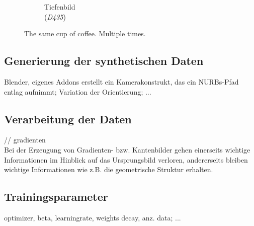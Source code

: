 \begin{figure}[h!]
\begin{subfigure}[b]{0.31\linewidth}
		\caption{Tiefenbild \\ (\textit{D435})}
	\end{subfigure}
	\caption{The same cup of coffee. Multiple times.}
	\label{fig:coffee3}
\end{figure}


\subsection{Generierung der synthetischen Daten}
Blender,
eigenes Addons erstellt ein Kamerakonstrukt, das ein NURBs-Pfad entlag aufnimmt; Variation der Orientierung; ...

\subsection{Verarbeitung der Daten}
// gradienten\\
Bei der Erzeugung von Gradienten- bzw. Kantenbilder gehen einerseits wichtige Informationen im Hinblick auf das Ursprungsbild verloren, andererseits bleiben wichtige Informationen wie z.B. die geometrische Struktur erhalten.

\subsection{Trainingsparameter}
optimizer, beta,
learningrate,
weights decay, anz. data; ...